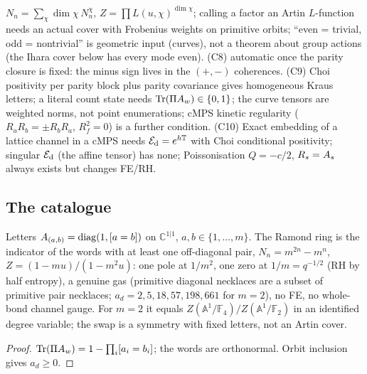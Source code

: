 \begin{observation}
$N_n = \sum_\chi\dim\chi\,N_n^\chi$, $Z = \prod L(u,\chi)^{\dim\chi}$; calling a factor an Artin
$L$-function needs an actual cover with Frobenius weights on primitive orbits; ``even = trivial,
odd = nontrivial'' is geometric input (curves), not a theorem about group actions (the Ihara cover
below has every mode even). (C8) automatic once the parity closure is fixed: the minus sign lives in
the $(+,-)$ coherences. (C9) Choi positivity per parity block plus parity covariance gives
homogeneous Kraus letters; a literal count state needs $\operatorname{Tr}(\Pi A_{w})\in\{0,1\}$; the curve
tensors are weighted norms, not point enumerations; cMPS kinetic regularity ($R_aR_b =
\pm R_bR_a$, $R_f^2 = 0$) is a further condition. (C10) Exact embedding of a lattice channel in a
cMPS needs $\mathcal E_{\mathrm d} = e^{h\mathbb T}$ with Choi conditional positivity; singular $\mathcal E_{\mathrm d}$ (the affine tensor)
has none; Poissonisation $Q = -c/2$, $R_s = A_{s}$ always exists but changes FE/RH.
\end{observation}

\subsection{The catalogue}

\begin{proposition}
\label{prop:e0-pair-shift}
Letters $A_{(a,b)} = \operatorname{diag}(1,[a = b])$ on $\mathbb C^{1|1}$, $a,b\in\{1,\dots,m\}$. The Ramond
ring is the indicator of the words with at least one off-diagonal pair, $N_n = m^{2n}-m^n$,
$Z = (1-mu)/(1-m^2u)$: one pole at $1/m^2$, one zero at $1/m = q^{-1/2}$ (RH by half entropy), a genuine
gas (primitive diagonal necklaces are a subset of primitive pair necklaces; $a_d = 2,5,18,57,198,661$
for $m = 2$), no FE, no whole-bond channel gauge. For $m = 2$ it equals
$Z(\mathbb A^1/\mathbb F_4)/Z(\mathbb A^1/\mathbb F_2)$ in an identified degree variable; the swap is a symmetry
with fixed letters, not an Artin cover.
\end{proposition}

\begin{proof}
$\operatorname{Tr}(\Pi A_{w}) = 1-\prod_i[a_i = b_i]$; the words are orthonormal. Orbit inclusion gives $a_d\ge0$.
\end{proof}


